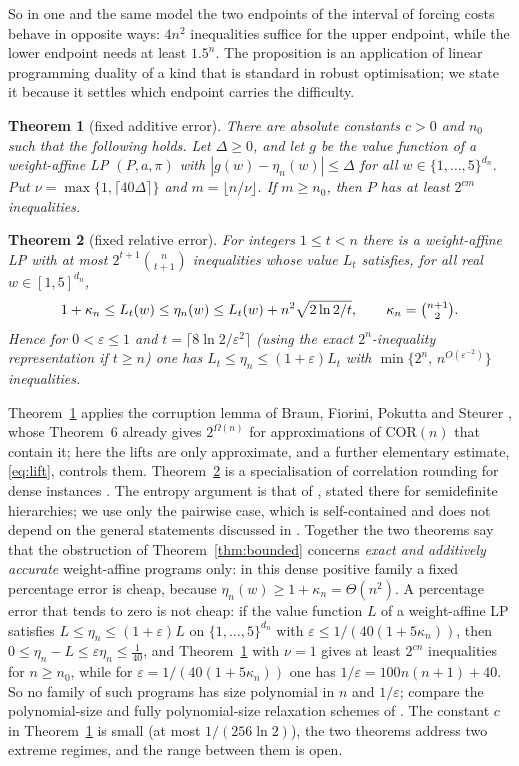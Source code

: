 \documentclass[11pt]{amsart}
\theoremstyle{plain}
\newtheorem{theorem}{Theorem}
\theoremstyle{definition}
\theoremstyle{remark}
\newcommand{\COR}{\mathrm{COR}}
\begin{document}
So in one and the same model the two endpoints of the interval of forcing costs behave in opposite ways: $4n^2$
inequalities suffice for the upper endpoint, while the lower endpoint needs at least $1.5^n$. The proposition is an
application of linear programming duality of a kind that is standard in robust optimisation; we state it because
it settles which endpoint carries the difficulty.

\begin{theorem}[fixed additive error]\label{thm:abs}
There are absolute constants $c>0$ and $n_0$ such that the following holds. Let $\Delta\ge0$, and let $g$ be the
value function of a weight-affine LP $(P,a,\pi)$ with $|g(w)-\eta_n(w)|\le\Delta$ for all
$w\in\{1,\dots,5\}^{d_n}$. Put $\nu=\max\{1,\lceil40\Delta\rceil\}$ and $m=\lfloor n/\nu\rfloor$. If $m\ge n_0$, then $P$
has at least $2^{cm}$ inequalities.
\end{theorem}

\begin{theorem}[fixed relative error]\label{thm:rel}
For integers $1\le t<n$ there is a weight-affine LP with at most $2^{t+1}\binom n{t+1}$ inequalities whose value
$L_t$ satisfies, for all real $w\in[1,5]^{d_n}$,
\[
 1+\kappa_n\le L_t(w)\le\eta_n(w)\le L_t(w)+n^2\sqrt{2\ln2/t},\qquad \kappa_n=\tbinom{n+1}{2}.
\]
Hence for $0<\varepsilon\le1$ and $t=\lceil8\ln2/\varepsilon^2\rceil$ (using the exact $2^n$-inequality
representation if $t\ge n$) one has $L_t\le\eta_n\le(1+\varepsilon)L_t$ with $\min\{2^n,\,n^{O(\varepsilon^{-2})}\}$
inequalities.
\end{theorem}

Theorem~\ref{thm:abs} applies the corruption lemma of Braun, Fiorini, Pokutta and Steurer \cite{BFPS}, whose
Theorem~6 already gives $2^{\Omega(n)}$ for approximations of $\COR(n)$ that contain it; here the lifts are only
approximate, and a further elementary estimate, \eqref{eq:lift}, controls them. Theorem~\ref{thm:rel} is a
specialisation of correlation rounding for dense instances \cite{RT,YZ,MR,JKR}. The entropy argument is that of
\cite[Lemma~4.5]{RT}, stated there for semidefinite hierarchies; we use only the pairwise case, which is
self-contained and does not depend on the general statements discussed in \cite{JKR}. Together the two theorems
say that the obstruction of Theorem~\ref{thm:bounded} concerns \emph{exact and additively accurate} weight-affine
programs only: in this dense positive family a fixed percentage error is cheap, because
$\eta_n(w)\ge1+\kappa_n=\Theta(n^2)$. A percentage error that tends to zero is not cheap: if the value function $L$
of a weight-affine LP satisfies $L\le\eta_n\le(1+\varepsilon)L$ on $\{1,\dots,5\}^{d_n}$ with
$\varepsilon\le1/(40(1+5\kappa_n))$, then $0\le\eta_n-L\le\varepsilon\eta_n\le\frac1{40}$, and
Theorem~\ref{thm:abs} with $\nu=1$ gives at least $2^{cn}$ inequalities for $n\ge n_0$, while for
$\varepsilon=1/(40(1+5\kappa_n))$ one has $1/\varepsilon=100n(n+1)+40$. So no family of such programs has size polynomial in $n$ and $1/\varepsilon$; compare the
polynomial-size and fully polynomial-size relaxation schemes of \cite{BPmatching}. The constant $c$ in
Theorem~\ref{thm:abs} is small (at most $1/(256\ln2)$), the two theorems address two extreme regimes, and the
range between them is open.
\end{document}
